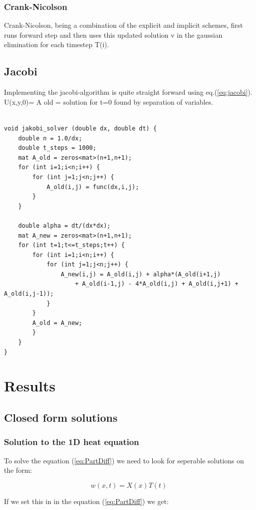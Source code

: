 \documentclass[a4paper,10pt]{article}
\begin{document}
\subsubsection{Crank-Nicolson}
Crank-Nicolson, being a combination of the explicit and implicit schemes, first runs forward step and then uses this updated solution v in the gaussian elimination for each timestep T(i).

\subsection{Jacobi}
Implementing the jacobi-algorithm is quite straight forward using eq.(\ref{eq:jacobi}). U(x,y,0)= A old = solution for t=0 found by separation of variables.
\begin{verbatim}

void jakobi_solver (double dx, double dt) {
    double n = 1.0/dx;
    double t_steps = 1000;
    mat A_old = zeros<mat>(n+1,n+1);
    for (int i=1;i<n;i++) {
        for (int j=1;j<n;j++) {
            A_old(i,j) = func(dx,i,j);
        }
    }

    double alpha = dt/(dx*dx);
    mat A_new = zeros<mat>(n+1,n+1);
    for (int t=1;t<=t_steps;t++) {
        for (int i=1;i<n;i++) {
            for (int j=1;j<n;j++) {
                A_new(i,j) = A_old(i,j) + alpha*(A_old(i+1,j)
                    + A_old(i-1,j) - 4*A_old(i,j) + A_old(i,j+1) + A_old(i,j-1));
            }
        }
        A_old = A_new;
        }
    }
} 
\end{verbatim}


\section{Results}
\subsection{Closed form solutions}
\subsubsection{Solution to the 1D heat equation}
To solve the equation (\ref{eq:PartDiff}) we need to look for seperable solutions on the form:

\begin{equation}
 w(x,t) = X(x)T(t)
 \label{eq:u_xt}
\end{equation}

If we set this in in the equation (\ref{eq:PartDiff}) we get:
\end{document}

